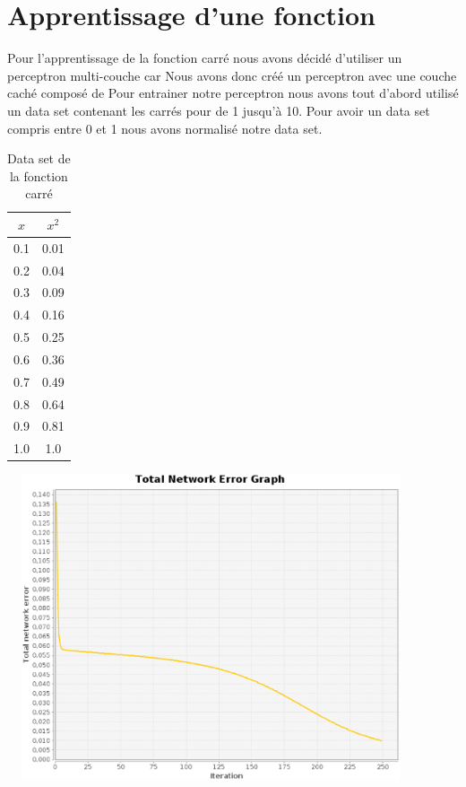 \documentclass[twoside,openright,a4paper,11pt,french]{article}
\begin{document}
\section{Apprentissage d'une fonction}
Pour l'apprentissage de la fonction carré nous avons décidé d'utiliser un perceptron
multi-couche car %
Nous avons donc créé un perceptron avec une couche caché composé de %
Pour entrainer notre perceptron nous avons tout d'abord utilisé un data set contenant
les carrés pour de 1 jusqu'à 10. Pour avoir un data set compris entre 0 et 1 nous avons
normalisé notre data set.

\begin{table}[h]
  \centering
  \begin{tabular}{| c | c |}
    \hline
    \textbf{$x$} & \textbf{$x^2$}\\
    \hline
    0.1 & 0.01 \\
    \hline
    0.2 & 0.04 \\
    \hline
    0.3 & 0.09 \\
    \hline
    0.4 & 0.16 \\
    \hline
    0.5 & 0.25 \\
    \hline
    0.6 & 0.36 \\
    \hline
    0.7 & 0.49 \\
    \hline
    0.8 & 0.64 \\
    \hline
    0.9 & 0.81 \\
    \hline
    1.0 & 1.0 \\
    \hline
  \end{tabular}
  \caption{Data set de la fonction carré}
  \label{tab:eq}
\end{table}

\includegraphics[width=12cm,height=9cm]{./pics/fct/carre_10_norm_std.eps}





\end{document}
